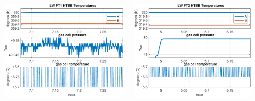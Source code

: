 \documentclass[9pt]{beamer}
\begin{document}
\begin{frame}
\begin{columns}[t]
\begin{column}{0.45\textwidth}
  \begin{centering}
  \includegraphics[width=\textwidth]{harvest_02-05/02-05_LW_FT1.pdf}
  \end{centering}
\end{column}
\begin{column}{0.45\textwidth}  
  \begin{centering}
  \includegraphics[width=\textwidth]{harvest_02-05/02-05_LW_FT2.pdf}
  \end{centering}
\end{column}
\end{columns}
\end{frame}
\end{document}
